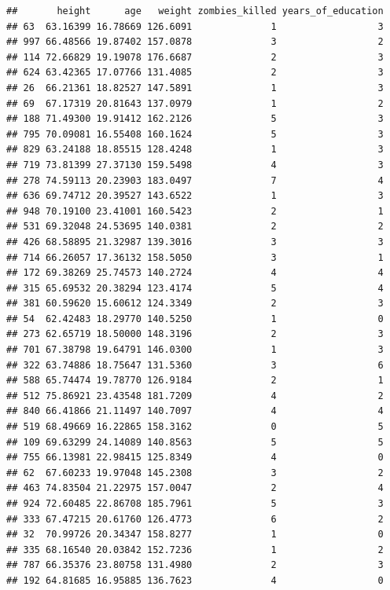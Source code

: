 \documentclass[]{article}
\begin{document}
\begin{verbatim}
##       height      age   weight zombies_killed years_of_education
## 63  63.16399 16.78669 126.6091              1                  3
## 997 66.48566 19.87402 157.0878              3                  2
## 114 72.66829 19.19078 176.6687              2                  3
## 624 63.42365 17.07766 131.4085              2                  3
## 26  66.21361 18.82527 147.5891              1                  3
## 69  67.17319 20.81643 137.0979              1                  2
## 188 71.49300 19.91412 162.2126              5                  3
## 795 70.09081 16.55408 160.1624              5                  3
## 829 63.24188 18.85515 128.4248              1                  3
## 719 73.81399 27.37130 159.5498              4                  3
## 278 74.59113 20.23903 183.0497              7                  4
## 636 69.74712 20.39527 143.6522              1                  3
## 948 70.19100 23.41001 160.5423              2                  1
## 531 69.32048 24.53695 140.0381              2                  2
## 426 68.58895 21.32987 139.3016              3                  3
## 714 66.26057 17.36132 158.5050              3                  1
## 172 69.38269 25.74573 140.2724              4                  4
## 315 65.69532 20.38294 123.4174              5                  4
## 381 60.59620 15.60612 124.3349              2                  3
## 54  62.42483 18.29770 140.5250              1                  0
## 273 62.65719 18.50000 148.3196              2                  3
## 701 67.38798 19.64791 146.0300              1                  3
## 322 63.74886 18.75647 131.5360              3                  6
## 588 65.74474 19.78770 126.9184              2                  1
## 512 75.86921 23.43548 181.7209              4                  2
## 840 66.41866 21.11497 140.7097              4                  4
## 519 68.49669 16.22865 158.3162              0                  5
## 109 69.63299 24.14089 140.8563              5                  5
## 755 66.13981 22.98415 125.8349              4                  0
## 62  67.60233 19.97048 145.2308              3                  2
## 463 74.83504 21.22975 157.0047              2                  4
## 924 72.60485 22.86708 185.7961              5                  3
## 333 67.47215 20.61760 126.4773              6                  2
## 32  70.99726 20.34347 158.8277              1                  0
## 335 68.16540 20.03842 152.7236              1                  2
## 787 66.35376 23.80758 131.4980              2                  3
## 192 64.81685 16.95885 136.7623              4                  0

\end{verbatim}
\end{document}
